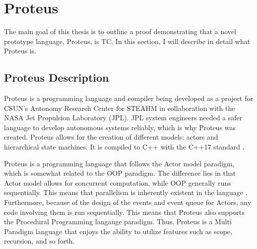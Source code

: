 



\section{Proteus}\label{sec:Proteus}

The main goal of this thesis is to outline a proof demonstrating that a novel prototype language, Proteus, is TC.
In this section, I will describe in detail what Proteus is.

\subsection{Proteus Description}\label{subsec:ProteusDescription}

Proteus is a programming language and compiler being developed as a project for CSUN's Autonomy Research Center for STEAHM in collaboration with the NASA Jet Propulsion Laboratory (JPL).
JPL system engineers needed a safer language to develop autonomous systems reliably, which is why Proteus was created.
Proteus allows for the creation of different models: actors and hierarchical state machines.
It is compiled to C++ with the C++17 standard \cite{ProteusRunTime}.

Proteus is a programming language that follows the Actor model paradigm, which is somewhat related to the OOP paradigm.
The difference lies in that Actor model allows for concurrent computation, while OOP generally runs sequentially.
This means that parallelism is inherently existent in the language \cite{ActorModelParallel,ActorJavaParallel}.
Furthermore, because of the design of the events and event queue for Actors, any code involving them is run sequentially.
This means that Proteus also supports the Procedural Programming langauge paradigm.
Thus, Proteus is a Multi Paradigm language that enjoys the ability to utilize features such as scope, recursion, and so forth.

